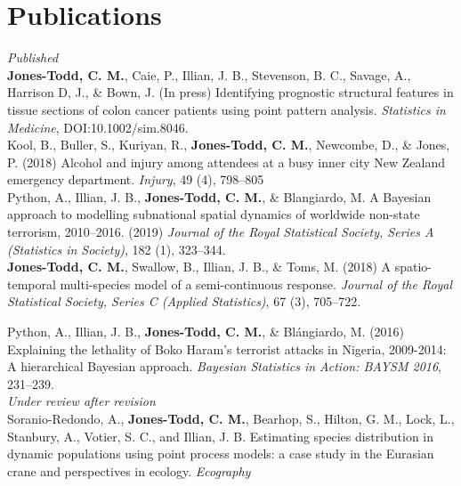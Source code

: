 \documentclass[10pt,a4paper]{moderncv}
\begin{document}
  \section{Publications}
  \vspace{5pt}

  \textit{\small{Published}}\\
  
\vspace{-3pt}
\textbf{Jones-Todd, C. M.}, Caie, P., Illian, J. B., Stevenson, B. C., Savage, A., Harrison D, J., \& Bown, J. (In press) Identifying prognostic structural features in tissue sections of colon cancer patients using point pattern analysis. \textit{Statistics in Medicine}, DOI:10.1002/sim.8046.\\


\vspace{-3pt}
Kool, B., Buller, S., Kuriyan, R., \textbf{Jones-Todd, C. M.}, Newcombe, D., \& Jones, P. (2018) Alcohol and injury among attendees at a busy inner city New Zealand emergency department. \textit{Injury}, 49 (4), 798--805\\


\vspace{-3pt}
Python, A.,  Illian, J. B., \textbf{Jones-Todd, C. M.}, \& Blangiardo, M. A Bayesian approach to modelling subnational spatial dynamics of worldwide non-state terrorism, 2010--2016. (2019) \textit{Journal of the Royal Statistical Society, Series  A (Statistics in Society)}, 182 (1), 323--344.\\

  \textbf{Jones-Todd, C. M.}, Swallow, B., Illian, J. B., \& Toms, M. (2018) A spatio-temporal multi-species model of a semi-continuous response. \textit{Journal of the Royal Statistical Society, Series C (Applied Statistics)}, 67 (3), 705--722.\\
\vspace{5pt}

\vspace{-3pt}
Python, A.,  Illian, J. B., \textbf{Jones-Todd, C. M.}, \& Bl\'{a}ngiardo, M. (2016) Explaining the lethality of Boko Haram’s terrorist attacks in Nigeria, 2009-2014: A hierarchical Bayesian approach. \textit{Bayesian Statistics in Action: BAYSM 2016}, 231--239.\\


\textit{\small{Under review after revision}}\\

\vspace{-3pt}
Soranio-Redondo, A., \textbf{Jones-Todd, C. M.}, Bearhop, S., Hilton, G. M., Lock, L., Stanbury, A., Votier, S. C., and Illian, J. B. Estimating species distribution in dynamic populations using point process models: a case study in the Eurasian crane and perspectives in ecology. \textit{Ecography}\\
\end{document}
